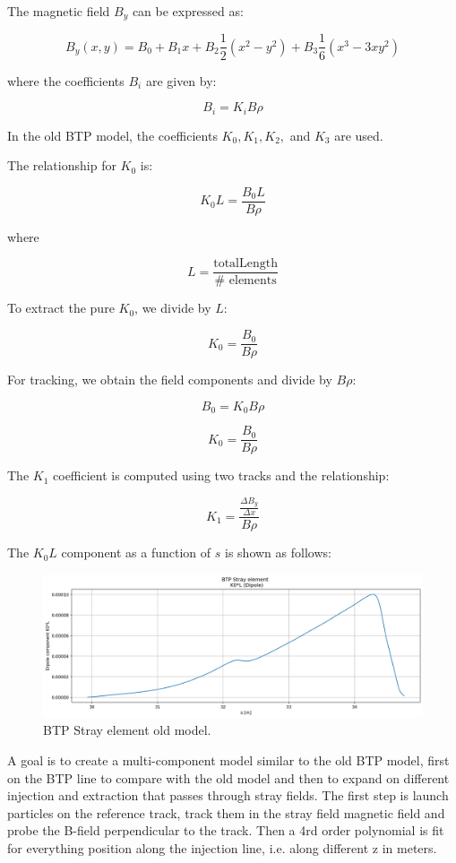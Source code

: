 The magnetic field \( B_y \) can be expressed as:

\[
B_{y}(x,y) = B_{0} + B_{1}x + B_{2}\frac{1}{2}(x^{2}-y^{2}) + B_{3}\frac{1}{6}(x^{3}-3xy^{2})
\]

where the coefficients \( B_i \) are given by:

\[
B_{i} = K_{i}B\rho
\]

In the old BTP model, the coefficients \( K_{0}, K_{1}, K_{2}, \) and \( K_{3} \) are used.

The relationship for \( K_{0} \) is:

\[
K_{0}L = \frac{B_{0}L}{B\rho}
\]

where 

\[
L = \frac{\text{totalLength}}{\# \text{ elements}}
\]

To extract the pure \( K_{0} \), we divide by \( L \):

\[
K_{0} = \frac{B_{0}}{B\rho}
\]

For tracking, we obtain the field components and divide by \( B\rho \):

\[
B_{0} = K_{0}B\rho
\]

\[
K_{0} = \frac{B_{0}}{B\rho}
\]

The \( K_{1} \) coefficient is computed using two tracks and the relationship:

\[
K_{1} = \frac{\frac{\Delta B_{y}}{\Delta x}}{B\rho}
\]

The \( K_{0}L \) component as a function of \( s \) is shown as follows:

\begin{figure}[H]
\centering
\includegraphics[width=1.0\textwidth]{02_Simulation/images/BTP_old_model_stray.png}
\caption{BTP Stray element old model.}
\label{fig:transfer_matrix_1}
\end{figure}


A goal is to create a multi-component model similar to the old BTP model, first on the BTP line to compare with the old model and then to expand on different injection and extraction that passes through stray fields. The first step is launch particles on the reference track, track them in the stray field magnetic field and probe the B-field perpendicular to the track. Then a 4rd order polynomial is fit for everything position along the injection line, i.e. along different z in meters.

